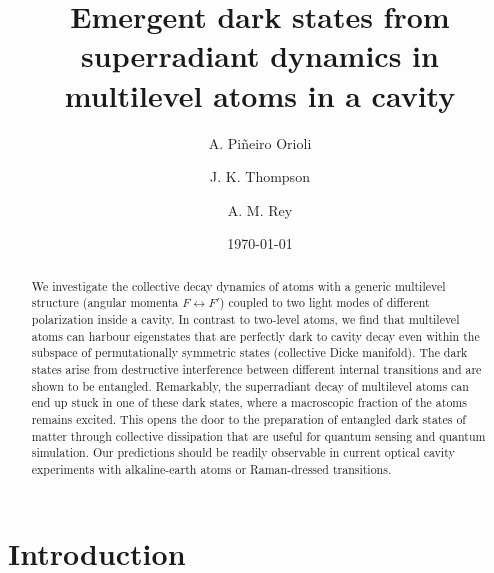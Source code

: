 \documentclass[aps,prx,superscriptaddress,twocolumn,notitlepage,nofootinbib,longbibliography]{revtex4-2}
\begin{document}
\title{Emergent dark states from superradiant dynamics in multilevel atoms in a cavity}


\author{A. Pi\~neiro Orioli}

\author{J. K. Thompson}

\author{A. M. Rey}


\pacs{}
\date{\today}

\begin{abstract}

We investigate the collective decay dynamics of atoms with a generic multilevel structure (angular momenta $F\leftrightarrow F'$) coupled to two light modes of different polarization inside a cavity.
In contrast to two-level atoms, we find that multilevel atoms can harbour eigenstates that are perfectly dark to cavity decay even within the subspace of permutationally symmetric states (collective Dicke manifold). The dark states arise from destructive interference between different internal transitions and are shown to be entangled.
Remarkably, the superradiant decay of multilevel atoms can end up stuck in one of these dark states, where a macroscopic fraction of the atoms remains excited. This opens the door to the preparation of entangled dark states of matter through collective dissipation that are useful for quantum sensing  and quantum simulation.
Our predictions should be readily observable in current optical cavity experiments with alkaline-earth atoms or Raman-dressed transitions. 

\end{abstract}

\maketitle





\section{Introduction}
\end{document}
